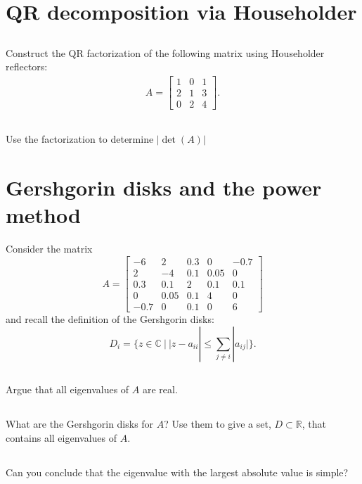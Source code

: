 \documentclass[11pt,letterpaper]{article}
\begin{document}
\section{QR decomposition via Householder}
\subsection{}
Construct the QR factorization of the following matrix
  using Householder reflectors:
\begin{align*}
{A} = 
\begin{bmatrix}
1 & 0 & 1 \\
2 & 1 & 3 \\
0 & 2 & 4
\end{bmatrix}.
\end{align*}
\subsection{}
Use the factorization to determine $|\det(A)|$

\section{Gershgorin disks and the power method}
Consider the matrix 
$$
A = \begin{bmatrix}
- 6 & 2 & 0.3 & 0 & -0.7 \\
2 & - 4 & 0.1 & 0.05 & 0 \\
0.3 & 0.1 & 2 & 0.1 & 0.1 \\
0 & 0.05 & 0.1 &  4 & 0 \\
-0.7 & 0 & 0.1  & 0  & 6
\end{bmatrix}
$$
and recall the definition of the Gershgorin disks:
\[
D_i = \{ z \in \mathbb C ~|~ |z - a_{ii}| \le \sum_{j \ne i} |a_{ij}| \}.
\]

\subsection{}
Argue that all eigenvalues of $A$ are real.

\subsection{}
What are the Gershgorin disks for $A$?  Use them to give a set, $D \subset \mathbb{R}$, that contains all eigenvalues of $A$.

\subsection{}
Can you conclude that the eigenvalue with the largest absolute value is simple?
\end{document}
